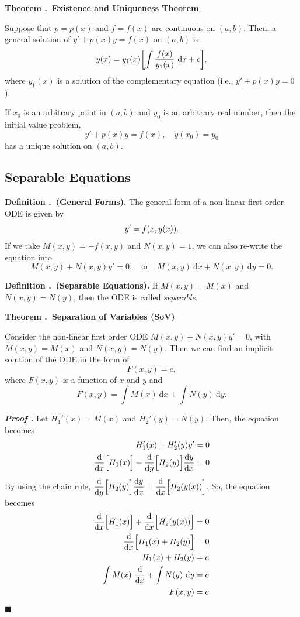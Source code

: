 \documentclass[12pt, a4paper]{article}
\newcounter{index}[subsection]
\newenvironment*{df}[1]{\par\noindent\textbf{Definition \thesubsection.\stepcounter{index}\theindex\ (#1).}}{\par}
\newenvironment*{thm}[1]{\begin{tcolorbox}\par\noindent\textbf{Theorem \thesubsection.\stepcounter{index}\theindex\ #1} \par}{\par\end{tcolorbox}}
\newcounter{nprf}[subsection]
\newenvironment*{prf}{\par\indent\textbf{\textit{Proof \stepcounter{nprf}\thenprf.}}}{\hfill$\blacksquare$\par}
\def\d{{\mathrm{d}}}
\def\dsst{\displaystyle}
\begin{document}
\begin{thm}{Existence and Uniqueness Theorem}
	Suppose that $p=p(x)$ and $f=f(x)$ are continuous on $(a,b)$. Then, a general solution of $y'+p(x)y=f(x)$ on $(a,b)$ is  \[y(x)=y_1(x)\qty[\int\dfrac{f(x)}{y_1(x)}\ \d{x}+c],\]	 where $y_1(x)$ is a solution of the complementary equation (i.e., $y'+p(x)y=0$).\par 
	If $x_0$ is an arbitrary point in $(a,b)$ and $y_0$ is an arbitrary real number, then the initial value problem, \[y'+p(x)y=f(x),\quad y(x_0)=y_0\] has a unique solution on $(a,b)$.
\end{thm}

\subsection{Separable Equations}
\begin{df}{General Forms}
	The general form of a non-linear first order ODE is given by \[y'=f\qty(x,y\qty(x)).\] If we take $M(x,y)=-f(x,y)$ and $N(x,y)=1$, we can also re-write the equation into \[M(x,y)+N(x,y)y'=0, \quad\text{or}\quad M(x,y)\ \d{x}+N(x,y)\ \d{y}=0.\]
\end{df}
\begin{df}{Separable Equations}
	If $M(x,y)=M(x)$ and $N(x,y)=N(y)$, then the ODE is called \textit{separable}.
\end{df}
\begin{thm}{Separation of Variables (SoV)}
	Consider the non-linear first order ODE $M(x,y)+N(x,y)y'=0$, with $M(x,y)=M(x)$ and $N(x,y)=N(y)$. Then we can find an implicit solution of the ODE in the form of \[F(x,y)=c,\] where $F(x,y)$ is a function of $x$ and $y$ and \[F(x,y)=\int M(x)\ \d{x}+\int N(y)\ \d{y}.\]
\end{thm}
\begin{prf}
	Let $H_1'(x)=M(x)$ and $H_2'(y)=N(y)$. Then, the equation becomes \[\begin{aligned}H_1'(x)+H_2'(y)y'&=0\\\dv{x}\qty\Big[H_1(x)]+\dv{y}\qty\Big[H_2(y)]\dv{y}{x}&=0\end{aligned}\] By using the chain rule, $\dsst\dv{y}\qty\Big[H_2(y)]\dv{y}{x}=\dv{x}\qty\Big[H_2\qty(y(x))].$ So, the equation becomes \[\begin{aligned}\dv{x}\qty\Big[H_1(x)]+\dv{x}\qty\Big[H_2\qty(y(x))]&=0\\\dv{x}\qty\Big[H_1(x)+H_2(y)]&=0\\H_1(x)+H_2(y)&=c\\\int M(x)\ \dv{x}+\int N(y)\ \d{y}&=c\\F(x,y)&=c\end{aligned}\]
\end{prf}
\end{document}

